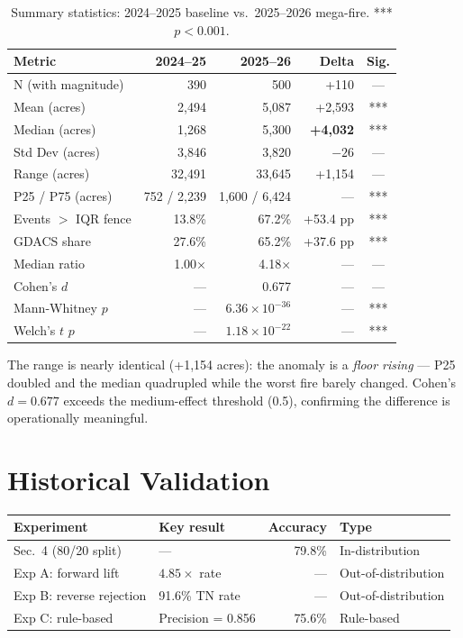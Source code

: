 \documentclass[12pt, letterpaper]{article}
\begin{document}
\begin{table}[H]
\centering
\caption{Summary statistics: 2024--2025 baseline vs.\ 2025--2026 mega-fire.
  *** $p<0.001$.}
\begin{tabular}{lrrrc}
\toprule
Metric & 2024--25 & 2025--26 & Delta & Sig. \\
\midrule
N (with magnitude)       & 390   & 500   & +110          & --- \\
Mean (acres)             & 2,494 & 5,087 & +2,593        & *** \\
Median (acres)           & 1,268 & 5,300 & \textbf{+4,032} & *** \\
Std Dev (acres)          & 3,846 & 3,820 & $-26$         & --- \\
Range (acres)            & 32,491& 33,645& +1,154        & --- \\
P25 / P75 (acres)        & 752 / 2,239 & 1,600 / 6,424 & --- & *** \\
Events $>$ IQR fence     & 13.8\%& 67.2\%& +53.4 pp      & *** \\
GDACS share              & 27.6\%& 65.2\%& +37.6 pp      & *** \\
Median ratio             & 1.00$\times$ & 4.18$\times$ & --- & --- \\
Cohen's $d$              & ---   & 0.677 & ---           & --- \\
Mann-Whitney $p$         & ---   & $6.36\!\times\!10^{-36}$ & --- & *** \\
Welch's $t$ $p$          & ---   & $1.18\!\times\!10^{-22}$ & --- & *** \\
\bottomrule
\end{tabular}
\end{table}

The range is nearly identical (+1,154 acres): the anomaly is a
\emph{floor rising} --- P25 doubled and the median quadrupled while the
worst fire barely changed. Cohen's $d = 0.677$ exceeds the medium-effect
threshold (0.5), confirming the difference is operationally meaningful.

\section{Historical Validation}

\begin{center}
\begin{tabular}{llrl}
\toprule
Experiment & Key result & Accuracy & Type \\
\midrule
Sec.\ 4 (80/20 split)    & ---                  & 79.8\% & In-distribution \\
Exp A: forward lift      & $4.85\times$ rate     & ---    & Out-of-distribution \\
Exp B: reverse rejection & 91.6\% TN rate        & ---    & Out-of-distribution \\
Exp C: rule-based        & Precision = 0.856     & 75.6\% & Rule-based \\
\bottomrule
\end{tabular}
\end{center}
\end{document}
